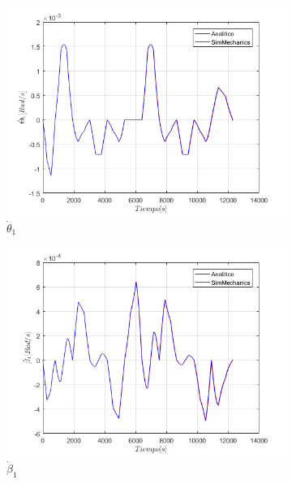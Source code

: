 \begin{figure}
    \centering
    \begin{subfigure}{0.45\textwidth}
        \includegraphics[width=\linewidth]{Cap4_DisenoBasico/Figura/ComparativoSimMechanics/Thetapunto1.png}
        \caption{$\dot{\theta}_1$}
    \end{subfigure}
    \begin{subfigure}{0.45\textwidth}
        \includegraphics[width=\linewidth]{Cap4_DisenoBasico/Figura/ComparativoSimMechanics/betapunto1.png}
        \caption{$\dot{\beta}_1$}
    \end{subfigure}
    \begin{subfigure}{0.45\textwidth}

\end{subfigure}
\end{figure}
